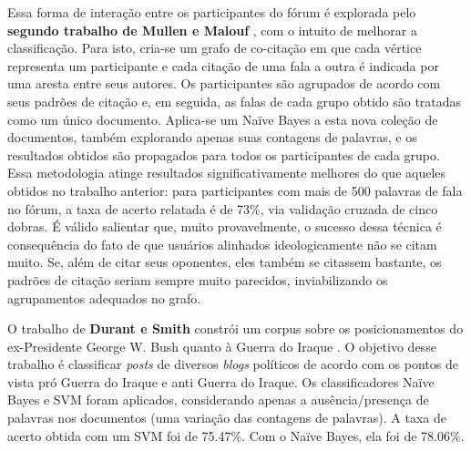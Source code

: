 

Essa forma de interação entre os participantes do fórum é explorada pelo \textbf{segundo trabalho de Mullen e Malouf} \cite{malouf-taking_sides}, com o intuito de melhorar a classificação. Para isto, cria-se um grafo de co-citação em que cada vértice representa um participante e cada citação de uma fala a outra é indicada por uma aresta entre seus autores. Os participantes são agrupados de acordo com seus padrões de citação e, em seguida, as falas de cada grupo obtido são tratadas como um único documento. Aplica-se um Naïve Bayes a esta nova coleção de documentos, também explorando apenas suas contagens de palavras, e os resultados obtidos são propagados para todos os participantes de cada grupo. Essa metodologia atinge resultados significativamente melhores do que aqueles obtidos no trabalho anterior: para participantes com mais de 500 palavras de fala no fórum, a taxa de acerto relatada é de 73\%, via validação cruzada de cinco dobras. É válido salientar que, muito provavelmente, o sucesso dessa técnica é consequência do fato de que usuários alinhados ideologicamente não se citam muito. Se, além de citar seus oponentes, eles também se citassem bastante, os padrões de citação seriam sempre muito parecidos, inviabilizando os agrupamentos adequados no grafo.

O trabalho de \textbf{Durant e Smith} constrói um corpus sobre os posicionamentos do ex-Presidente George W. Bush quanto à Guerra do Iraque \cite{durant-smith}. O objetivo desse trabalho é classificar \emph{posts} de diversos \emph{blogs} políticos de acordo com os pontos de vista pró Guerra do Iraque e anti Guerra do Iraque.  Os classificadores Naïve Bayes e SVM foram aplicados, considerando apenas a ausência/presença de palavras nos documentos (uma variação das contagens de palavras). A taxa de acerto obtida com um SVM foi de 75.47\%. Com o Naïve Bayes, ela foi de 78.06\%. 

